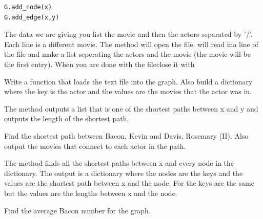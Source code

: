 \begin{lstlisting}
G.add_node(x)
G.add_edge(x,y)
\end{lstlisting}

The data we are giving you list the movie and then the actors separated by '/'. Each line is a different movie.  The method  will open the file.  will read ina line of the file and make a list seperating the actors and the movie (the movie will be the first entry). When you are done with the fileclose it with

\begin{problem}
Write a function that loads the text file into the graph. Also build a dictionary where the key is the actor and the values are the movies that the actor was in.
\end{problem}

The method  outputs a list that is one of the shortest paths between x and y and  outputs the length of the shortest path.

\begin{problem}
Find the shortest path between Bacon, Kevin and Davis, Rosemary (II). Also output the movies that connect to each actor in the path. 
\end{problem}

The method  finds all the shortest paths between x and every node in the dictionary. The output is a dictionary where the nodes are the keys and the values are the shortest path between x and the node. For  the keys are the same but the values are the lengths between x and the node.

\begin{problem}
Find the average Bacon number for the graph. 
\end{problem}

